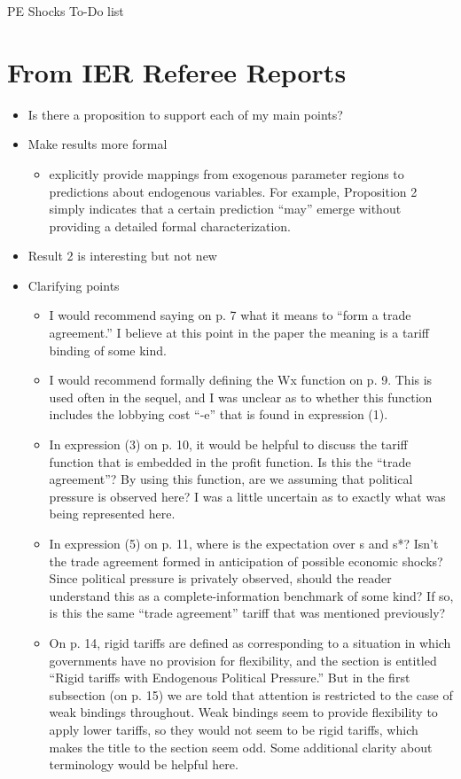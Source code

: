 \documentclass[12pt]{article}
\begin{document}
\begin{center}
PE Shocks To-Do list
\end{center}


\section{From IER Referee Reports}
\begin{itemize}
	\item Is there a proposition to support each of my main points?
	\item Make results more formal
		\begin{itemize}
			\item explicitly provide mappings from exogenous parameter regions to predictions about endogenous variables. For example, Proposition 2 simply indicates that a certain prediction ``may'' emerge without providing a detailed formal characterization.
		\end{itemize}
	\item Result 2 is interesting but not new
	\item Clarifying points
		\begin{itemize}
			\item I would recommend saying on p. 7 what it means to “form a trade agreement.” I believe at this point in the paper the meaning is a tariff binding of some kind.
			\item I would recommend formally defining the Wx function on p. 9. This is used often in the sequel, and I was unclear as to whether this function includes the lobbying cost “-e” that is found in expression (1).
			\item In expression (3) on p. 10, it would be helpful to discuss the tariff function that is embedded in the profit function. Is this the “trade agreement”? By using this function, are we assuming that political pressure is observed here? I was a little uncertain as to exactly what was being represented here.
			\item In expression (5) on p. 11, where is the expectation over s and s*? Isn’t the trade agreement formed in anticipation of possible economic shocks? Since political pressure is privately observed, should the reader understand this as a complete-information benchmark of some kind? If so, is this the same “trade agreement” tariff that was mentioned previously?
			\item On p. 14, rigid tariffs are defined as corresponding to a situation in which governments have no provision for flexibility, and the section is entitled “Rigid tariffs with Endogenous Political Pressure.” But in the first subsection (on p. 15) we are told that attention is restricted to the case of weak bindings throughout. Weak bindings seem to provide flexibility to apply lower tariffs, so they would not seem to be rigid tariffs, which makes the title to the section seem odd. Some additional clarity about terminology would be helpful here.

\end{itemize}
\end{itemize}
\end{document}
